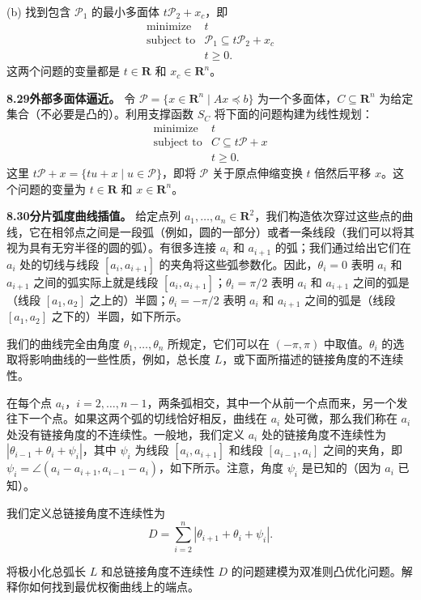 \documentclass[UTF8,12pt,a4paper,fontset=fandol]{ctexart}
\begin{document}
(b) 找到包含 $\mathcal P_1$ 的最小多面体 $t\mathcal P_2+x_c$，即
\[
\begin{array}{ll}
\mbox{minimize} & t\\
\mbox{subject to} & \mathcal P_1\subseteq t\mathcal P_2+x_c\\
& t\geq 0.
\end{array}
\]
这两个问题的变量都是 $t\in\mathbf{R}$ 和 $x_c\in\mathbf{R}^n$。

\noindent\textbf{8.29\quad 外部多面体逼近。}
令 $\mathcal P=\{x\in\mathbf{R}^n\mid Ax\preceq b\}$ 为一个多面体，$C\subseteq\mathbf{R}^n$ 为给定集合（不必要是凸的）。利用支撑函数 $S_C$ 将下面的问题构建为线性规划：
\[
\begin{array}{ll}
\mbox{minimize} & t\\
\mbox{subject to} & C\subseteq t\mathcal P+x\\
& t\geq 0.
\end{array}
\]
这里 $t\mathcal P+x=\{tu+x\mid u\in\mathcal P\}$，即将 $\mathcal P$ 关于原点伸缩变换 $t$ 倍然后平移 $x$。这个问题的变量为 $t\in\mathbf{R}$ 和 $x\in\mathbf{R}^n$。

\noindent\textbf{8.30\quad 分片弧度曲线插值。}
给定点列 $a_1,\ldots,a_n\in\mathbf{R}^2$，我们构造依次穿过这些点的曲线，它在相邻点之间是一段弧（例如，圆的一部分）或者一条线段（我们可以将其视为具有无穷半径的圆的弧）。有很多连接 $a_i$ 和 $a_{i+1}$ 的弧；我们通过给出它们在 $a_i$ 处的切线与线段 $[a_i,a_{i+1}]$ 的夹角将这些弧参数化。因此，$\theta_i=0$ 表明 $a_i$ 和 $a_{i+1}$ 之间的弧实际上就是线段 $[a_i,a_{i+1}]$；$\theta_i=\pi/2$ 表明 $a_i$ 和 $a_{i+1}$ 之间的弧是（线段 $[a_1,a_2]$ 之上的）半圆；$\theta_i=-\pi/2$ 表明 $a_i$ 和 $a_{i+1}$ 之间的弧是（线段 $[a_1,a_2]$ 之下的）半圆，如下所示。

我们的曲线完全由角度 $\theta_1,\ldots,\theta_n$ 所规定，它们可以在 $(-\pi,\pi)$ 中取值。$\theta_i$ 的选取将影响曲线的一些性质，例如，总长度 $L$，或下面所描述的链接角度的不连续性。

在每个点 $a_i$，$i=2,\ldots,n-1$，两条弧相交，其中一个从前一个点而来，另一个发往下一个点。如果这两个弧的切线恰好相反，曲线在 $a_i$ 处可微，那么我们称在 $a_i$ 处没有链接角度的不连续性。一般地，我们定义 $a_i$ 处的链接角度不连续性为 $|\theta_{i-1}+\theta_i+\psi_i|$，其中 $\psi_i$ 为线段 $[a_i,a_{i+1}]$ 和线段 $[a_{i-1},a_i]$ 之间的夹角，即 $\psi_i=\angle(a_i-a_{i+1},a_{i-1}-a_i)$，如下所示。注意，角度 $\psi_i$ 是已知的（因为 $a_i$ 已知）。

我们定义总链接角度不连续性为
\[
D=\sum_{i=2}^n|\theta_{i+1}+\theta_i+\psi_i|.
\]

将极小化总弧长 $L$ 和总链接角度不连续性 $D$ 的问题建模为双准则凸优化问题。解释你如何找到最优权衡曲线上的端点。
\end{document}
